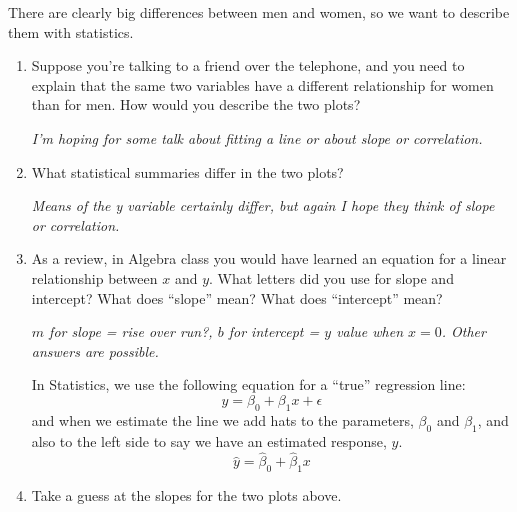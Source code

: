There are clearly big differences between men and women, so we want to
describe them with statistics.\vspace{-.5cm}
\begin{enumerate}
  \item Suppose you're talking to a friend over the telephone, and
    you need to explain  that the same two variables
    have a different relationship for women than for men. How would you
    describe the two plots? 
\begin{students}
 \vspace{2cm}      
\end{students}

\begin{key}
  {\it  I'm hoping for some talk about fitting a line or about slope
    or correlation.}
\end{key}

\item What statistical summaries differ in the two plots?
\begin{students}
 \vspace{2cm}      
\end{students}

\begin{key}
  {\it  Means of the y variable certainly differ,  but again I hope
    they think of slope  or correlation. }
\end{key}



\item As a review, in Algebra class you would have learned an equation
  for a linear relationship between $x$ and $y$.  What letters did you
  use for slope and intercept?  What does ``slope'' mean?  What does
  ``intercept'' mean?
\begin{students}
 \vspace{2cm}      
\end{students}

\begin{key}
  {\it $m$ for slope = rise over run?, $b$ for intercept = $y$ value
    when $x=0$. Other answers are possible.}
\end{key}


  In Statistics, we use the following equation for a ``true'' regression  line:
  $$ y = \beta_0 + \beta_1 x + \epsilon  $$
  and when we estimate the line we add hats to the parameters,
  $\beta_0$ and $\beta_1$, and also to the left side to say we have an
  estimated response, $\hat{y}$.
  $$ \hat{y} = \hat{\beta}_0 + \hat{\beta}_1 x$$
\item Take a guess at the  slopes for the two plots above.
\begin{students}
 \vspace{2cm}      
\end{students}


\end{enumerate}
